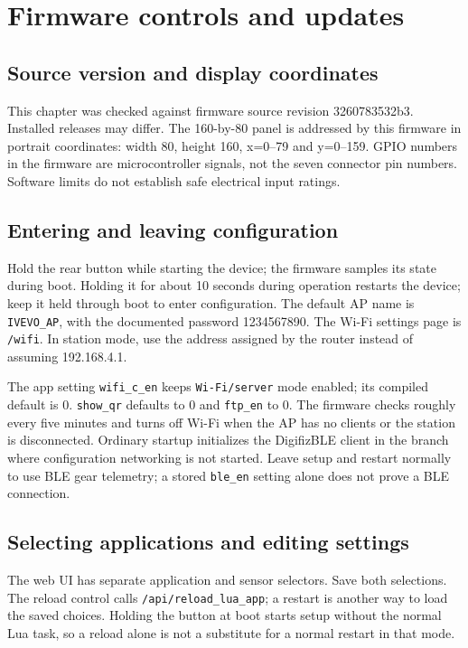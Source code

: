 \chapter{Firmware controls and updates}\label{ch:firmware}
\section{Source version and display coordinates}
This chapter was checked against firmware source revision 3260783532b3. Installed releases may differ. The 160-by-80 panel is addressed by this firmware in portrait coordinates: width 80, height 160, x=0–79 and y=0–159. GPIO numbers in the firmware are microcontroller signals, not the seven connector pin numbers. Software limits do not establish safe electrical input ratings.

\section{Entering and leaving configuration}
Hold the rear button while starting the device; the firmware samples its state during boot. Holding it for about 10 seconds during operation restarts the device; keep it held through boot to enter configuration. The default AP name is \nolinkurl{IVEVO_AP}, with the documented password 1234567890. The Wi-Fi settings page is \nolinkurl{/wifi}. In station mode, use the address assigned by the router instead of assuming 192.168.4.1.

The app setting \nolinkurl{wifi_c_en} keeps \nolinkurl{Wi-Fi/server} mode enabled; its compiled default is 0. \nolinkurl{show_qr} defaults to 0 and \nolinkurl{ftp_en} to 0. The firmware checks roughly every five minutes and turns off Wi-Fi when the AP has no clients or the station is disconnected. Ordinary startup initializes the DigifizBLE client in the branch where configuration networking is not started. Leave setup and restart normally to use BLE gear telemetry; a stored \nolinkurl{ble_en} setting alone does not prove a BLE connection.

\section{Selecting applications and editing settings}
The web UI has separate application and sensor selectors. Save both selections. The reload control calls \nolinkurl{/api/reload_lua_app}; a restart is another way to load the saved choices. Holding the button at boot starts setup without the normal Lua task, so a reload alone is not a substitute for a normal restart in that mode.

